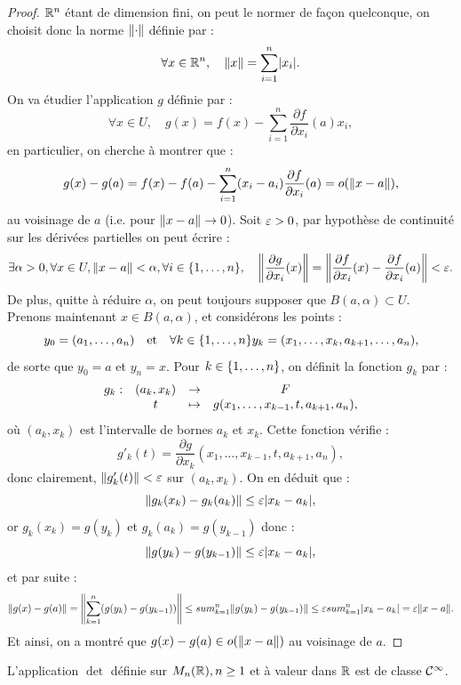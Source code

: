 \begin{proof}
$\R^n$ étant de dimension fini, on peut le normer de façon quelconque, on choisit donc la norme $\norm{\cdot}$ définie par :
\[ \forall x \in \R^n, \quad \norm{x} = \sum_{i=1}^n \abs{x_i} . \]
On va étudier l'application $g$ définie par :
\[ \forall x \in U, \quad g(x) = f(x) - \sum_{i=1}^n \dfrac{\partial f}{\partial x_i} (a) x_i , \]
en particulier, on cherche à montrer que :
\[ g(x) - g(a) = f(x) - f(a) - \sum_{i=1}^n (x_i-a_i) \dfrac{\partial f}{\partial x_i} (a) = o(\norm{x-a}) , \]
au voisinage de $a$ (i.e. pour $\norm{x-a} \to 0$).
Soit $\veps>0$, par hypothèse de continuité sur les dérivées partielles on peut écrire :
\[ \exists \alpha >0, \forall x \in U, \norm{x-a} < \alpha, \forall i \in \set{1, \dots, n}, \quad 
	\norm*{\dfrac{\partial g}{\partial x_i}(x)} = \norm*{\dfrac{\partial f}{\partial x_i}(x) - \dfrac{\partial f}{\partial x_i}(a)} < \veps . \]
De plus, quitte à réduire $\alpha$, on peut toujours supposer que $B(a, \alpha) \subset U$.
Prenons maintenant $x \in B(a, \alpha)$, et considérons les points :
\[ y_0 = (a_1, \dots, a_n) \et \forall k \in \set{1, \dots, n} y_k = (x_1, \dots, x_k, a_{k+1}, \dots, a_n) , \]
de sorte que $y_0 = a$ et $y_n=x$. Pour $k \in \set{1, \dots, n}$, on définit la fonction $g_k$ par :
\[ \begin{array}{c c c c}
g_k : & (a_k, x_k) & \to & F \\
& t & \mapsto & g(x_1, \dots, x_{k-1}, t, a_{k+1}, a_n) , 
\end{array} \]
où $(a_k, x_k)$ est l'intervalle de bornes $a_k$ et $x_k$. Cette fonction vérifie :
\[ g'_k(t) = \dfrac{\partial g}{\partial x_k}(x_1, \dots, x_{k-1}, t, a_{k+1}, a_n) , \]
donc clairement, $\norm{g'_k(t)} < \veps$ sur $(a_k, x_k)$. On en déduit que :
\[ \norm{g_k(x_k) - g_k(a_k)} \leq \veps \abs{x_k-a_k} , \]
or $g_k(x_k) = g(y_k)$ et $g_k(a_k) = g(y_{k-1})$ donc :
\[ \norm{g(y_k) - g(y_{k-1})} \leq \veps \abs{x_k-a_k} , \]
et par suite :
\[ \norm{g(x) - g(a)} = \norm*{\sum_{k=1}^n (g(y_k) - g(y_{k-1}))} \leq sum_{k=1}^n \norm{g(y_k) - g(y_{k-1})}
	\leq \veps sum_{k=1}^n \abs{x_k-a_k} = \veps \norm{x-a} . \]
Et ainsi, on a montré que $g(x)-g(a) \in o(\norm{x-a})$ au voisinage de $a$.
\end{proof}

\begin{lem}
L'application $\det$ définie sur $\Mnr, n \geq 1$ et à valeur dans $\R$ est de classe $\C^{\infty}$.
\end{lem}


